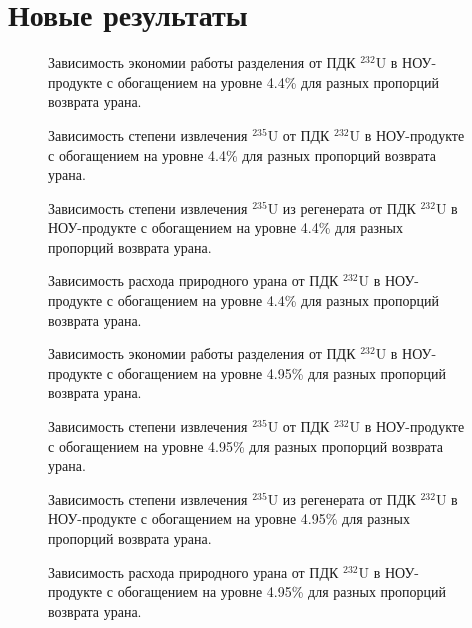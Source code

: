 \chapter{Новые результаты}

\begin{figure}

\caption{{Зависимость экономии работы разделения от ПДК $^{232}$U в НОУ-продукте с обогащением на уровне 4.4\% для разных пропорций возврата урана.{\label{sw44}}}}
\end{figure}

\begin{figure}

\caption{{Зависимость степени извлечения $^{235}$U от ПДК $^{232}$U в НОУ-продукте с обогащением на уровне 4.4\% для разных пропорций возврата урана.{\label{ex44}}}}
\end{figure}

\begin{figure}

\caption{{Зависимость степени извлечения $^{235}$U из регенерата от ПДК $^{232}$U в НОУ-продукте с обогащением на уровне 4.4\% для разных пропорций возврата урана.{\label{exR44}}}}
\end{figure}

\begin{figure}

\caption{{Зависимость расхода природного урана от ПДК $^{232}$U в НОУ-продукте с обогащением на уровне 4.4\% для разных пропорций возврата урана.{\label{F0R44}}}}
\end{figure}


\begin{figure}

\caption{{Зависимость экономии работы разделения от ПДК $^{232}$U в НОУ-продукте с обогащением на уровне 4.95\% для разных пропорций возврата урана.{\label{sw495}}}}
\end{figure}

\begin{figure}

\caption{{Зависимость степени извлечения $^{235}$U от ПДК $^{232}$U в НОУ-продукте с обогащением на уровне 4.95\% для разных пропорций возврата урана.{\label{ex495}}}}
\end{figure}

\begin{figure}

\caption{{Зависимость степени извлечения $^{235}$U из регенерата от ПДК $^{232}$U в НОУ-продукте с обогащением на уровне 4.95\% для разных пропорций возврата урана.{\label{exR495}}}}
\end{figure}

\begin{figure}

\caption{{Зависимость расхода природного урана от ПДК $^{232}$U в НОУ-продукте с обогащением на уровне 4.95\% для разных пропорций возврата урана.{\label{F0R495}}}}
\end{figure}






\clearpage